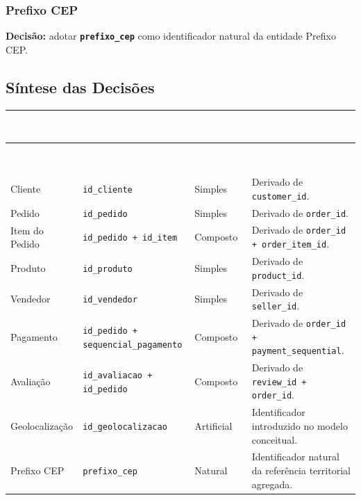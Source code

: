 \documentclass[12pt,a4paper]{article}
\begin{document}
	\subsubsection{Prefixo CEP}
	
	\noindent
	\textbf{Decisão:}
	adotar \textbf{\texttt{prefixo\_cep}} como identificador natural da entidade
	Prefixo CEP.
	
	\subsection{Síntese das Decisões}
	
	{\small
		\renewcommand{\arraystretch}{1.35}
		
		\begin{longtable}{
				|>{\raggedright\arraybackslash}p{2.8cm}
				|>{\raggedright\arraybackslash}p{4.6cm}
				|>{\raggedright\arraybackslash}p{2.4cm}
				|>{\raggedright\arraybackslash}p{3.8cm}|
			}
			\hline
			\rowcolor{AzulCorporativo}
			\textcolor{white}{\textbf{Entidade}} &
			\textcolor{white}{\textbf{Identificador Conceitual}} &
			\textcolor{white}{\textbf{Estrutura}} &
			\textcolor{white}{\textbf{Origem / Observação}} \\ \hline
			\endfirsthead
			
			\hline
			\rowcolor{AzulCorporativo}
			\textcolor{white}{\textbf{Entidade}} &
			\textcolor{white}{\textbf{Identificador Conceitual}} &
			\textcolor{white}{\textbf{Estrutura}} &
			\textcolor{white}{\textbf{Origem / Observação}} \\ \hline
			\endhead
			
			Cliente & \texttt{id\_cliente} & Simples & Derivado de \texttt{customer\_id}. \\ \hline
			Pedido & \texttt{id\_pedido} & Simples & Derivado de \texttt{order\_id}. \\ \hline
			Item do Pedido & \texttt{id\_pedido + id\_item} & Composto & Derivado de \texttt{order\_id + order\_item\_id}. \\ \hline
			Produto & \texttt{id\_produto} & Simples & Derivado de \texttt{product\_id}. \\ \hline
			Vendedor & \texttt{id\_vendedor} & Simples & Derivado de \texttt{seller\_id}. \\ \hline
			Pagamento & \texttt{id\_pedido + sequencial\_pagamento} & Composto & Derivado de \texttt{order\_id + payment\_sequential}. \\ \hline
			Avaliação & \texttt{id\_avaliacao + id\_pedido} & Composto & Derivado de \texttt{review\_id + order\_id}. \\ \hline
			Geolocalização & \texttt{id\_geolocalizacao} & Artificial & Identificador introduzido no modelo conceitual. \\ \hline
			Prefixo CEP & \texttt{prefixo\_cep} & Natural & Identificador natural da referência territorial agregada. \\ \hline
		\end{longtable}
	}
	
\end{document}
